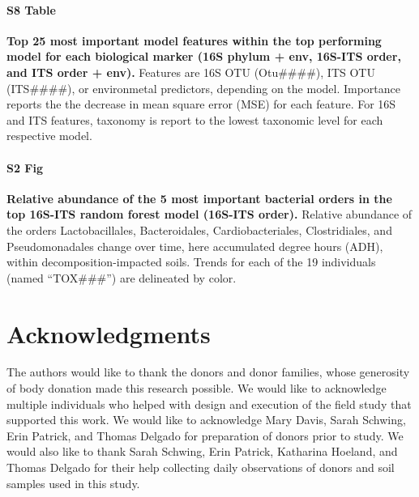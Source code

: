 \documentclass[
  10pt,
  letterpaper,
]{article}
\begin{document}
\paragraph*{S8 Table}
\label{top-feat-table}
{\textbf{Top 25 most important model features within the top performing
model for each biological marker (16S phylum + env, 16S-ITS order, and
ITS order + env).}} Features are 16S OTU (Otu\#\#\#\#), ITS OTU
(ITS\#\#\#\#), or environmetal predictors, depending on the model.
Importance reports the the decrease in mean square error (MSE) for each
feature. For 16S and ITS features, taxonomy is report to the lowest
taxonomic level for each respective model.

\paragraph*{S2 Fig}
\label{s2-fig}
{\textbf{Relative abundance of the 5 most important bacterial orders in
the top 16S-ITS random forest model (16S-ITS order).}} Relative
abundance of the orders Lactobacillales, Bacteroidales,
Cardiobacteriales, Clostridiales, and Pseudomonadales change over time,
here accumulated degree hours (ADH), within decomposition-impacted
soils. Trends for each of the 19 individuals (named ``TOX\#\#\#'') are
delineated by color.

\section{Acknowledgments}\label{acknowledgments}

The authors would like to thank the donors and donor families, whose
generosity of body donation made this research possible. We would like
to acknowledge multiple individuals who helped with design and execution
of the field study that supported this work. We would like to
acknowledge Mary Davis, Sarah Schwing, Erin Patrick, and Thomas Delgado
for preparation of donors prior to study. We would also like to thank
Sarah Schwing, Erin Patrick, Katharina Hoeland, and Thomas Delgado for
their help collecting daily observations of donors and soil samples used
in this study.
\end{document}
